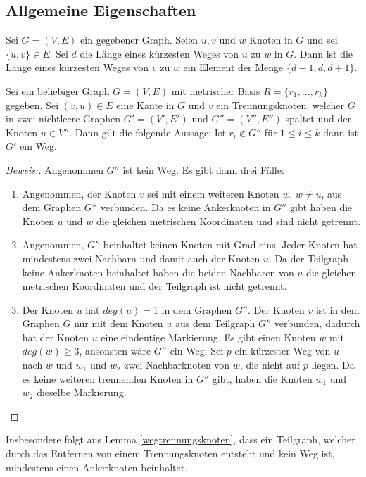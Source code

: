 \subsection{Allgemeine Eigenschaften}
\begin{lem}\cite{landmarks}
\label{dist}
Sei $G=(V,E)$ ein gegebener Graph. Seien $u,v$ und $w$ Knoten in $G$ und sei $\{u,v\}\in E$. Sei $d$ die Länge eines kürzesten Weges von $u$ zu $w$ in $G$. Dann ist die Länge eines kürzesten Weges von $v$ zu $w$ ein Element der Menge $\{d-1,d,d+1\}$.
\end{lem}
\begin{lem}
\label{wegtrennungsknoten}
\label{first_theorem}
Sei ein beliebiger Graph $G=(V,E)$ mit metrischer Basis $R=\{r_1, \ldots, r_k\}$ gegeben. Sei $(v,u) \in E$ eine Kante in $G$ und $v$ ein Trennungsknoten, welcher $G$ in zwei nichtleere Graphen $G'=(V',E')$ und $G''=(V'',E'')$ spaltet und der Knoten $u \in V''$. Dann gilt die folgende Aussage:\newline
Ist $r_i \notin G''$ für $1 \leq i \leq k$ dann ist $G'$ ein Weg.
\end{lem}
\begin{proof}[Beweis:]
Angenommen $G''$ ist kein Weg. Es gibt dann drei Fälle:
\begin{enumerate}
\item Angenommen, der Knoten $v$ sei mit einem weiteren Knoten $w$, $w \neq u$, aus dem Graphen $G''$ verbunden. Da es keine Ankerknoten in $G''$ gibt haben die Knoten $u$ und $w$ die gleichen metrischen Koordinaten und sind nicht getrennt.
\item Angenommen, $G''$ beinhaltet keinen Knoten mit Grad eins. Jeder Knoten hat mindestens zwei Nachbarn und damit auch der Knoten $u$. Da der Teilgraph keine Ankerknoten beinhaltet haben die beiden Nachbaren von $u$ die gleichen metrischen Koordinaten und der Teilgraph ist nicht getrennt.
\item Der Knoten $u$ hat $deg(u)=1$ in dem Graphen $G''$. Der Knoten $v$ ist in dem Graphen $G$ nur mit dem Knoten $u$ aus dem Teilgraph $G''$ verbunden, dadurch hat der Knoten $u$ eine eindeutige Markierung. Es gibt einen Knoten $w$ mit $deg(w) \geq 3$, ansonsten wäre $G''$ ein Weg. Sei $p$ ein kürzester Weg von $u$ nach $w$ und $w_1$ und $w_2$ zwei Nachbarknoten von $w$, die nicht auf $p$ liegen. Da es keine weiteren trennenden Knoten in $G''$ gibt, haben die Knoten $w_1$ und $w_2$ dieselbe Markierung.   
\end{enumerate}
\end{proof}
\begin{bem}
Insbesondere folgt aus Lemma \ref{wegtrennungsknoten}, dass ein Teilgraph, welcher durch das Entfernen von einem Trennungsknoten entsteht und kein Weg ist, mindestens einen Ankerknoten beinhaltet.
\end{bem}
